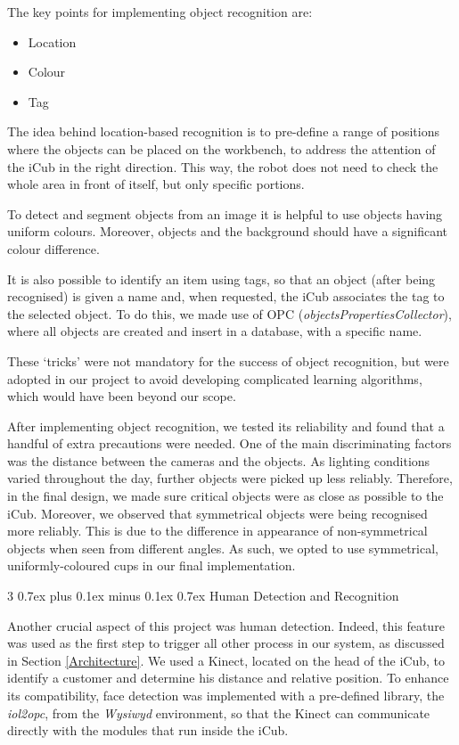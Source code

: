 \documentclass[conference]{IEEEtran}
\makeatletter
\def\subsubsection{\@startsection{subsubsection}%
	{3}%
	{\z@}%
	{0.7ex plus 0.1ex minus 0.1ex}%
	{0.7ex}%
	{\normalfont\normalsize\itshape}}%
\makeatother
\begin{document}
The key points for implementing object recognition are: 

\begin{itemize}
\item Location
\item Colour
\item Tag
\end{itemize}
	

The idea behind location-based recognition is to pre-define a range of positions where the objects can be placed on the workbench, to address the attention of the iCub in the right direction. This way, the robot does not need to check the whole area in front of itself, but only specific portions. 

To detect and segment objects from an image it is helpful to use objects having uniform colours. Moreover, objects and the background should have a significant colour difference.

It is also possible to identify an item using tags, so that an object (after being recognised) is given a name and, when requested, the iCub associates the tag to the selected object. To do this, we made use of OPC (\textit{objectsPropertiesCollector}), where all objects are created and insert in a database, with a specific name.

These `tricks' were not mandatory for the success of object recognition, but were adopted in our project to avoid developing complicated learning algorithms, which would have been beyond our scope. 

After implementing object recognition, we tested its reliability and found that a handful of extra precautions were needed. One of the main discriminating factors was the distance between the cameras and the objects. As lighting conditions varied throughout the day, further objects were picked up less reliably. Therefore, in the final design, we made sure critical objects were as close as possible to the iCub. Moreover, we observed that symmetrical objects were being recognised more reliably. This is due to the difference in appearance of non-symmetrical objects when seen from different angles. As such, we opted to use symmetrical, uniformly-coloured cups in our final implementation. 

\subsubsection{Human Detection and Recognition} \label{humanDetection}

Another crucial aspect of this project was human detection. Indeed, this feature was used as the first step to trigger all other process in our system, as discussed in Section \ref{Architecture}. We used a Kinect, located on the head of the iCub, to identify a customer and determine his distance and relative position. To enhance its compatibility, face detection was implemented with a pre-defined library, the \textit{iol2opc}, from the \textit{Wysiwyd} environment, so that the Kinect can communicate directly with the modules that run inside the iCub.
\end{document}

